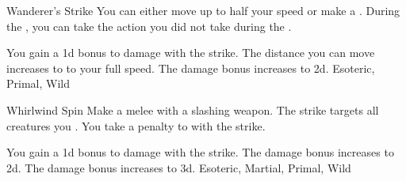 \lowercase{\hypertarget{maneuver:Wanderer's Strike}{}}\label{maneuver:Wanderer's Strike}
\hypertarget{maneuver:Wanderer's Strike}{}
\begin{freeability}{Wanderer's Strike}
You can either move up to half your speed or make a .
During the , you can take the action you did not take during the .

\rankline
{} You gain a \plus1d bonus to damage with the strike.
 The distance you can move increases to to your full speed.
 The damage bonus increases to \plus2d.
 Esoteric, Primal, Wild
\end{freeability}
\vspace{0.25em}



\lowercase{\hypertarget{maneuver:Whirlwind Spin}{}}\label{maneuver:Whirlwind Spin}
\hypertarget{maneuver:Whirlwind Spin}{}
\begin{apability}{Whirlwind Spin}
Make a melee  with a slashing weapon.
The strike targets all creatures you .
You take a  penalty to  with the strike.

\rankline
{} You gain a \plus1d bonus to damage with the strike.
 The damage bonus increases to \plus2d.
 The damage bonus increases to \plus3d.
 Esoteric, Martial, Primal, Wild
\end{apability}
\vspace{0.25em}

